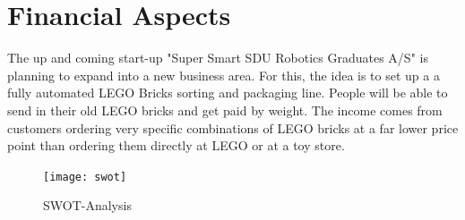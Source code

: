 \chapter{Financial Aspects}\label{chap:financial_aspects_chapter}
The up and coming start-up "Super Smart SDU Robotics Graduates A/S" is planning to expand into a new business area. For this, the idea is to set up a a fully automated LEGO Bricks sorting and packaging line. People will be able to send in their old LEGO bricks and get paid by weight. The income comes from customers ordering very specific combinations of LEGO bricks at a far lower price point than ordering them directly at LEGO or at a toy store. 

	\begin{figure}[H]
        \centering
        \texttt{[image: swot]}
        \caption{SWOT-Analysis}
        \label{fig:swot}
    \end{figure}
    
